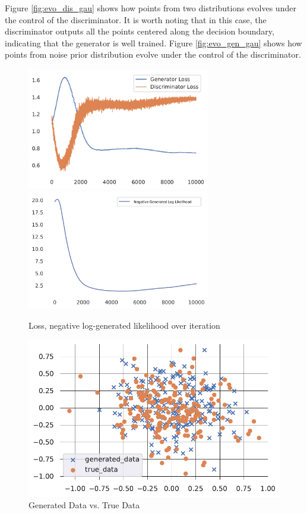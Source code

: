 Figure \ref{fig:evo_dis_gau} shows how points from two distributions evolves under the control of the discriminator. It is worth noting that in this case, the discriminator outputs all the points centered along the decision boundary, indicating that the generator is well trained. Figure \ref{fig:evo_gen_gau} shows how points from noise prior distribution evolve under the control of the discriminator. 
\begin{figure}
    \centering
    \includegraphics[width = 8cm]{GAN_gau.pdf}\includegraphics[width = 8cm]{GAN_gau_likeli.png}
    \caption{Loss, negative log-generated likelihood over iteration}
    \label{fig:gauiter}
\end{figure}
\begin{figure}
    \centering
    \includegraphics[width = 13cm]{comparison.pdf}
    \caption{Generated Data vs. True Data}
    \label{fig:comparison}
\end{figure}
